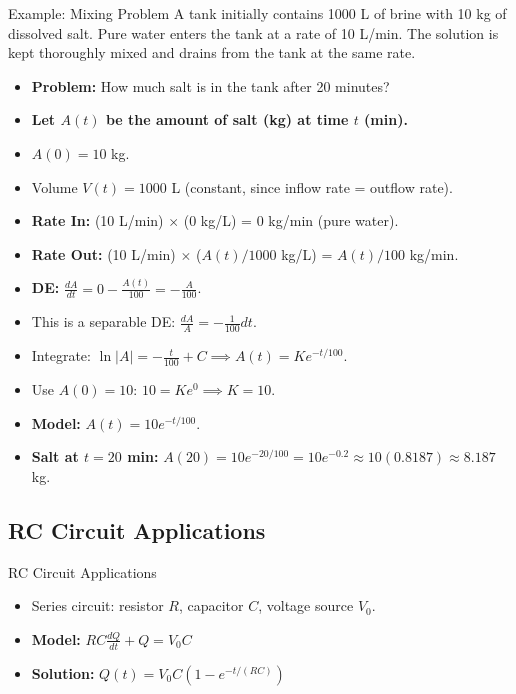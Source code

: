 \documentclass[10pt,aspectratio=169]{beamer}
\begin{document}
\begin{frame}{Example: Mixing Problem}
    A tank initially contains 1000 L of brine with 10 kg of dissolved salt. Pure water enters the tank at a rate of 10 L/min. The solution is kept thoroughly mixed and drains from the tank at the same rate.
    \begin{itemize}
        \item \textbf{Problem:} How much salt is in the tank after 20 minutes?
        \item \textbf{Let $A(t)$ be the amount of salt (kg) at time $t$ (min).}
        \item $A(0) = 10$ kg.
        \item Volume $V(t) = 1000$ L (constant, since inflow rate = outflow rate).
        \item \textbf{Rate In:} (10 L/min) $\times$ (0 kg/L) = 0 kg/min (pure water).
        \item \textbf{Rate Out:} (10 L/min) $\times$ ($A(t)/1000$ kg/L) = $A(t)/100$ kg/min.
        \item \textbf{DE:} $\frac{dA}{dt} = 0 - \frac{A(t)}{100} = -\frac{A}{100}$.
        \item This is a separable DE: $\frac{dA}{A} = -\frac{1}{100} dt$.
        \item Integrate: $\ln|A| = -\frac{t}{100} + C \implies A(t) = Ke^{-t/100}$.
        \item Use $A(0)=10$: $10 = Ke^0 \implies K=10$.
        \item \textbf{Model:} $A(t) = 10e^{-t/100}$.
        \item \textbf{Salt at $t=20$ min:} $A(20) = 10e^{-20/100} = 10e^{-0.2} \approx 10(0.8187) \approx 8.187$ kg.
    \end{itemize}
\end{frame}

\subsection{RC Circuit Applications}
\begin{frame}{RC Circuit Applications}
    \begin{itemize}
        \item Series circuit: resistor $R$, capacitor $C$, voltage source $V_0$.
        \item \textbf{Model:} $RC\frac{dQ}{dt} + Q = V_0C$
        \item \textbf{Solution:} $Q(t) = V_0C(1 - e^{-t/(RC)})$
    \end{itemize}
\end{frame}
\end{document}
